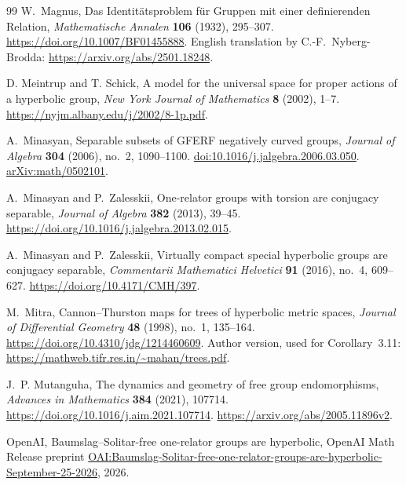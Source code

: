 \begin{thebibliography}{99}
W.~Magnus,
Das Identit\"atsproblem f\"ur Gruppen mit einer definierenden Relation,
\emph{Mathematische Annalen} \textbf{106} (1932), 295--307.
\url{https://doi.org/10.1007/BF01455888}.
English translation by C.-F.~Nyberg-Brodda:
\url{https://arxiv.org/abs/2501.18248}.

D. Meintrup and T. Schick,
A model for the universal space for proper actions of a hyperbolic group,
\emph{New York Journal of Mathematics} \textbf{8} (2002), 1--7.
\url{https://nyjm.albany.edu/j/2002/8-1p.pdf}.

A.~Minasyan,
Separable subsets of GFERF negatively curved groups,
\emph{Journal of Algebra} \textbf{304} (2006), no.~2, 1090--1100.
\href{https://doi.org/10.1016/j.jalgebra.2006.03.050}{doi:10.1016/j.jalgebra.2006.03.050}.
\href{https://arxiv.org/abs/math/0502101}{arXiv:math/0502101}.

A.~Minasyan and P.~Zalesskii,
One-relator groups with torsion are conjugacy separable,
\emph{Journal of Algebra} \textbf{382} (2013), 39--45.
\url{https://doi.org/10.1016/j.jalgebra.2013.02.015}.

A.~Minasyan and P.~Zalesskii,
Virtually compact special hyperbolic groups are conjugacy separable,
\emph{Commentarii Mathematici Helvetici} \textbf{91} (2016), no.~4,
609--627.
\url{https://doi.org/10.4171/CMH/397}.

M.~Mitra,
Cannon--Thurston maps for trees of hyperbolic metric spaces,
\emph{Journal of Differential Geometry} \textbf{48} (1998), no.~1, 135--164.
\url{https://doi.org/10.4310/jdg/1214460609}.
Author version, used for Corollary~3.11:
\url{https://mathweb.tifr.res.in/~mahan/trees.pdf}.

J.~P. Mutanguha,
The dynamics and geometry of free group endomorphisms,
\emph{Advances in Mathematics} \textbf{384} (2021), 107714.
\url{https://doi.org/10.1016/j.aim.2021.107714}.
\url{https://arxiv.org/abs/2005.11896v2}.

\begingroup\raggedright
OpenAI,
Baumslag--Solitar-free one-relator groups are hyperbolic,
OpenAI Math Release preprint
\href{https://github.com/openai/math/blob/main/preprints/Baumslag-Solitar-free-one-relator-groups-are-hyperbolic-September-25-2026/paper.pdf}{OAI:Baumslag-Solitar-free-one-relator-groups-are-hyperbolic-September-25-2026},
2026.
\par\endgroup


\end{thebibliography}

